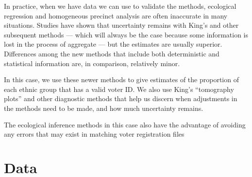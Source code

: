 \documentclass[12pt]{article}
\begin{document}
In practice, when we have data we can use to validate the methods,
ecological regression and homogeneous precinct analysis are often
inaccurate in many situations. Studies have shown that uncertainty
remains with King's and other subsequent methods --- which will always
be the case because some information is lost in the process of
aggregate --- but the estimates are usually superior. Differences
among the new methods that include both deterministic and statistical
information are, in comparison, relatively minor.

In this case, we use these newer methods to give estimates of the
proportion of each ethnic group that has a valid voter ID.  We also
use King's ``tomography plots'' and other diagnostic methods that help
us discern when adjustments in the methods need to be made, and how
much uncertainty remains.

The ecological inference methods in this case also have the advantage
of avoiding any errors that may exist in matching voter registration files

\section{Data}\label{s:data}

\singlespace
 
\bibsep=0in 
{}

\end{document}
